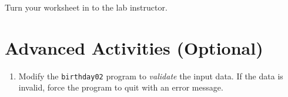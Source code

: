 \documentclass[12pt]{scrartcl}
\begin{document}
Turn your worksheet in to the lab instructor.

\section{Advanced Activities (Optional)}

\begin{enumerate}
  \item Modify the \texttt{birthday02} program to \emph{validate} the 
  	input data.  If the data is invalid, force the program to quit with an error 
	message.
%
\end{enumerate}
\end{document}
